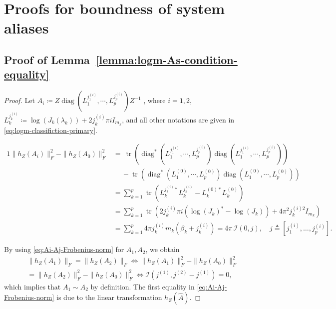 \documentclass[letterpaper,10pt,journal,final]{IEEEtran}
\theoremstyle{definition}
\theoremstyle{remark}
\newcommand{\diag}{\operatorname{diag}}
\newcommand{\trace}{\operatorname{tr}}
\begin{document}
\section{Proofs for boundness of system aliases}
\label{appdix:proof-lemmas}

\subsection{Proof of Lemma~\ref{lemma:logm-As-condition-equality}}
\label{appdix:proof-lemma-1}

\begin{proof}
  Let $A_{i} \coloneqq Z \diag(L_1^{j_1^{(i)}}, \cdots, L_p^{j_p^{(i)}}) Z^{-1}$
, where $i = 1,2$, $L_k^{j_k^{(i)}} \coloneqq \log(J_k(\lambda_k)) + 2 j_k^{(i)} \pi i I_{m_k}$, and all other notations are given in \eqref{eq:logm-classifiction-primary}.
  \begin{figure*}[htb]
      \begin{alignat}{1}
        \|h_Z({A}_{i})\|_F^2 - \|h_Z({A_0})\|_F^2 & = \ \trace\left(\diag^*(L_1^{j_1^{(i)}}, \cdots, L_p^{j_p^{(i)}})
           \diag(L_1^{j_1^{(i)}}, \cdots, L_p^{j_p^{(i)}}) \right) \nonumber\\
        &\quad\  - \trace\left(\diag^*(L_1^{(0)}, \cdots, L_p^{(0)})
           \diag(L_1^{(0)}, \cdots, L_p^{(0)}) \right)\nonumber\\
        &= \textstyle\sum_{k=1}^p \trace\left( L_k^{j_k^{(i)}*}L_k^{j_k^{(i)}} -
                                   L_k^{(0)*}L_k^{(0)} \right) \label{eq:Ai-Aj-Frobenius-norm} \\
        &= \textstyle\sum_{k=1}^p \trace\left( 2j_k^{(i)} \pi i \left(\log(J_k)^* - \log(J_k)\right) + 4\pi^2j_k^{(i)2} I_{m_k} \right) \nonumber\\
        &=\textstyle\sum_{k=1}^p 4\pi j_k^{(i)} m_k (\beta_k + j_k^{(i)})
        =4\pi\, \mathscr{I}(0, \textit{j}), \quad \textit{j} \triangleq [j_1^{(i)}, \dots, j_p^{(i)}]. \nonumber
      \end{alignat}
  \end{figure*}
  By using \eqref{eq:Ai-Aj-Frobenius-norm} for $A_1, A_2$, we obtain
  \begin{align*}
    &\|h_Z(A_1)\|_F = \|h_Z(A_2)\|_F \Leftrightarrow \|h_Z(A_1)\|_F^2 - \|h_Z(A_0)\|_F^2 \\
    & = \|h_Z(A_2)\|_F^2 - \|h_Z(A_0)\|_F^2 \Leftrightarrow \mathscr{I}(\textit{j}^{(1)}, \textit{j}^{(2)} - \textit{j}^{(1)}) = 0,
  \end{align*}
  which implies that $A_1 \sim A_2$ by definition. The first equality in \eqref{eq:Ai-Aj-Frobenius-norm} is due to the linear transformation $h_Z(\hat{A})$.
\end{proof}
\end{document}
